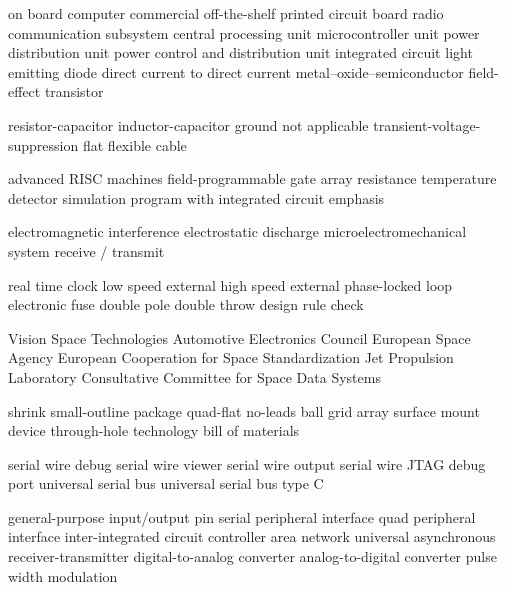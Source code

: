      {on board computer}
    {commercial off-the-shelf}
     {printed circuit board}
     {radio communication subsystem}
     {central processing unit}
     {microcontroller unit}
     {power distribution unit}
    {power control and distribution unit}
      {integrated circuit}
     {light emitting diode}
    {direct current to direct current}
  {metal–oxide–semiconductor field-effect transistor}

      {resistor-capacitor}
      {inductor-capacitor}
     {ground}
      {not applicable}
     {transient-voltage-suppression}
     {flat flexible cable}

     {advanced RISC machines}
    {field-programmable gate array}
     {resistance temperature detector}
   {simulation program with integrated circuit emphasis}

     {electromagnetic interference}
     {electrostatic discharge}
    {microelectromechanical system}
   {receive / transmit}

     {real time clock}
     {low speed external}
     {high speed external}
     {phase-locked loop}
   {electronic fuse}
    {double pole double throw}
     {design rule check}

     {Vision Space Technologies}
     {Automotive Electronics Council}
     {European Space Agency}
   {European Cooperation for Space Standardization}
     {Jet Propulsion Laboratory}
   {Consultative Committee for Space Data Systems}

    {shrink small-outline package}
     {quad-flat no-leads}
     {ball grid array}
     {surface mount device}
     {through-hole technology}
     {bill of materials}

     {serial wire debug}
     {serial wire viewer}
     {serial wire output}
  {serial wire JTAG debug port}
     {universal serial bus}
   {universal serial bus type C}

    {general-purpose input/output pin}
     {serial peripheral interface}
     {quad peripheral interface}
     {inter-integrated circuit}
     {controller area network}
    {universal asynchronous receiver-transmitter}
     {digital-to-analog converter}
     {analog-to-digital converter}
     {pulse width modulation}
